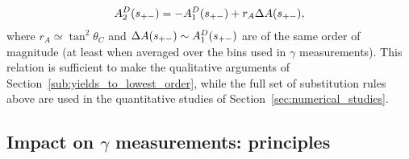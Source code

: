 \begin{align}\label{eq:A1_A2_relation}
    A^{D}_2(s_{+-}) = -A^{D}_1(s_{+-})+r_A \Delta A(s_{+-}),
\end{align}
where $r_A\simeq\tan^2\theta_C $ and $\Delta A(s_{+-})\sim A^{D}_1(s_{+-})$ are of the same order of magnitude (at least when averaged over the bins used in $\gamma$ measurements). 
This relation is sufficient to make the qualitative arguments of Section~\ref{sub:yields_to_lowest_order}, while the full set of substitution rules above are used in the quantitative studies of Section~\ref{sec:numerical_studies}.



\subsection{\texorpdfstring{Impact on $\gamma$ measurements: principles}{Impact on gamma measurements: principles}}%
\label{sub:impact_on_}

